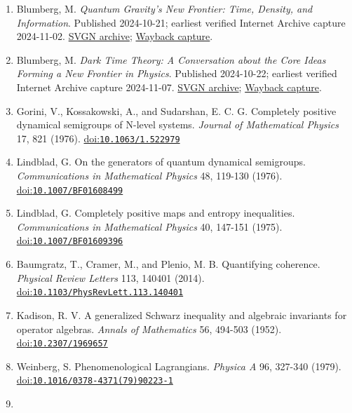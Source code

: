 \documentclass[
  american,
  11pt,
  letterpaper,
]{article}
\begin{document}
\begin{enumerate}
\item
  Blumberg, M. \emph{Quantum Gravity's New Frontier: Time, Density, and Information}. Published 2024-10-21; earliest verified Internet Archive capture 2024-11-02. \href{https://svgn.io/wiki/svgn/articles/2024-10-21-quantum-gravity-s-new-frontier-time-density-and-information-svgn-150437245.html}{SVGN archive}; \href{https://web.archive.org/web/20241102214706/https://www.svgn.io/p/quantum-gravitys-new-frontier-time}{Wayback capture}.
\item
  Blumberg, M. \emph{Dark Time Theory: A Conversation about the Core Ideas Forming a New Frontier in Physics}. Published 2024-10-22; earliest verified Internet Archive capture 2024-11-07. \href{https://svgn.io/wiki/svgn/articles/2024-10-22-dark-time-theory-a-conversation-about-the-core-ideas-forming-a-new-frontier-in-physics-svgn-150579946.html}{SVGN archive}; \href{https://web.archive.org/web/20241107022842/https://www.svgn.io/p/dark-time-theory-a-conversation-about}{Wayback capture}.
\item
  Gorini, V., Kossakowski, A., and Sudarshan, E. C. G. Completely positive dynamical semigroups of N-level systems. \emph{Journal of Mathematical Physics} 17, 821 (1976). \href{https://doi.org/10.1063/1.522979}{doi:\nolinkurl{10.1063/1.522979}}
\item
  Lindblad, G. On the generators of quantum dynamical semigroups. \emph{Communications in Mathematical Physics} 48, 119-130 (1976). \href{https://doi.org/10.1007/BF01608499}{doi:\nolinkurl{10.1007/BF01608499}}
\item
  Lindblad, G. Completely positive maps and entropy inequalities. \emph{Communications in Mathematical Physics} 40, 147-151 (1975). \href{https://doi.org/10.1007/BF01609396}{doi:\nolinkurl{10.1007/BF01609396}}
\item
  Baumgratz, T., Cramer, M., and Plenio, M. B. Quantifying coherence. \emph{Physical Review Letters} 113, 140401 (2014). \href{https://doi.org/10.1103/PhysRevLett.113.140401}{doi:\nolinkurl{10.1103/PhysRevLett.113.140401}}
\item
  Kadison, R. V. A generalized Schwarz inequality and algebraic invariants for operator algebras. \emph{Annals of Mathematics} 56, 494-503 (1952). \href{https://doi.org/10.2307/1969657}{doi:\nolinkurl{10.2307/1969657}}
\item
  Weinberg, S. Phenomenological Lagrangians. \emph{Physica A} 96, 327-340 (1979). \href{https://doi.org/10.1016/0378-4371(79)90223-1}{doi:\nolinkurl{10.1016/0378-4371(79)90223-1}}
\item

\end{enumerate}
\end{document}
